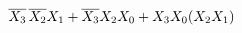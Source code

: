 \documentclass[preview]{standalone}
\begin{document}
\begin{align*}
\overline{X_3}\nobreak\hspace{.16667em plus .08333em}\overline{X_2}X_1+\overline{X_3}X_2X_0+X_3X_0(X_2X_1)
\end{align*}
\end{document}
